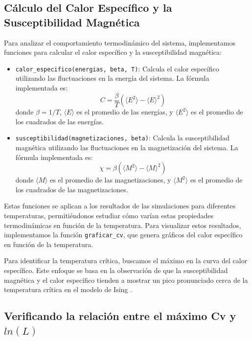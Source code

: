 \documentclass[twocolumn]{article}
\begin{document}
\subsection*{Cálculo del Calor Específico y la Susceptibilidad Magnética}

Para analizar el comportamiento termodinámico del sistema, implementamos funciones para calcular el calor específico y la susceptibilidad magnética:

\begin{itemize}
    \item \texttt{calor\_especifico(energias, beta, T)}: Calcula el calor específico utilizando las fluctuaciones en la energía del sistema. La fórmula implementada es:
    \begin{equation}
        C = \frac{\beta}{T} (\langle E^2 \rangle - \langle E \rangle^2)
    \end{equation}
    donde $\beta = 1/T$, $\langle E \rangle$ es el promedio de las energías, y $\langle E^2 \rangle$ es el promedio de los cuadrados de las energías.

    \item \texttt{susceptibilidad(magnetizaciones, beta)}: Calcula la susceptibilidad magnética utilizando las fluctuaciones en la magnetización del sistema. La fórmula implementada es:
    \begin{equation}
        \chi = \beta (\langle M^2 \rangle - \langle M \rangle^2)
    \end{equation}
    donde $\langle M \rangle$ es el promedio de las magnetizaciones, y $\langle M^2 \rangle$ es el promedio de los cuadrados de las magnetizaciones.
\end{itemize}

Estas funciones se aplican a los resultados de las simulaciones para diferentes temperaturas, permitiéndonos estudiar cómo varían estas propiedades termodinámicas en función de la temperatura. Para visualizar estos resultados, implementamos la función \texttt{graficar\_cv}, que genera gráficos del calor específico en función de la temperatura.

Para identificar la temperatura crítica, buscamos el máximo en la curva del calor específico. Este enfoque se basa en la observación de que la susceptibilidad magnética y el calor específico tienden a mostrar un pico pronunciado cerca de la temperatura crítica en el modelo de Ising \cite{3933} \cite{sandvik2010computational}.

\subsection*{Verificando la relación entre el máximo Cv y $ln(L)$}
\end{document}

